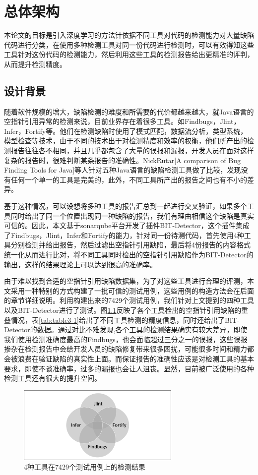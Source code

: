 \chapter{总体架构}
本论文的目标是引入深度学习的方法针依据不同工具对代码的检测能力对大量缺陷代码进行分类，在使用多种检测工具对同一份代码进行检测时，可以有效得知这些工具针对这份代码的检测能力，然后利用这些工具的检测报告给出更精准的评判，从而提升检测精度。
\section{设计背景}
随着软件规模的增大，缺陷检测的难度和所需要的代价都越来越大，就Java语言的空指针引用异常的检测来说，目前业界存在着很多工具。如Findbugs，Jlint，Infer，Fortify等。他们在检测缺陷时使用了模式匹配，数据流分析，类型系统，模型检查等技术，由于不同的技术出于对检测精度和效率的权衡，他们所产出的检测报告往往各不相同，并且几乎都包含了大量的误报和漏报，开发人员在面对这样复杂的报告时，很难判断某条报告的准确性。NickRutar[A comparison of Bug Finding Tools for Java]等人针对五种Java语言的缺陷检测工具做了比较，发现没有任何一个单一的工具是完美的，此外，不同工具所产出的报告之间也有不小的差异。

基于这种情况，可以设想将多种工具的报告汇总到一起进行交叉验证，如果多个工具同时给出了同一个位置出现同一种缺陷的报告，我们有理由相信这个缺陷是真实可信的。因此，本文基于sonarqube平台开发了插件BIT-Detector，这个插件集成了Findbugs，Jlint，Infer和Fortify的能力，针对同一份待测代码，首先使用4种工具分别检测并给出报告，然后过滤出空指针引用缺陷，最后将4份报告的内容格式统一化从而进行比对，将不同工具同时检出的空指针引用缺陷作为BIT-Detector的输出，这样的结果理论上可以达到很高的准确率。

由于难以找到合适的空指针引用缺陷数据集，为了对这些工具进行合理的评测，本文采用一种特别的方式构建了一批可信的测试用例，这些用例的构造方法会在后面的章节详细说明。利用构建出来的7429个测试用例，我们针对上文提到的四种工具以及BIT-Detector进行了测试。图\ref{fig:figure3-1}反映了各个工具检出的空指针引用缺陷的重叠情况，表\ref{tab:table3-1}给出了不同工具检测的精度信息，同时还给出了BIT-Detector的数据。通过对比不难发现,各个工具的检测结果确实有较大差异，即使我们使用检测准确度最高的Findbugs，也会面临超过三分之一的误报，这些误报掺杂在检测报告中会给开发人员的缺陷修复带来很多困扰，可能很多时间和精力都会被浪费在验证缺陷的真实性上面。而保证报告的准确性应该是对检测工具的基本要求，即使不谈准确率，过多的漏报也会让人沮丧。显然，目前被广泛使用的各种检测工具还有很大的提升空间。

\begin{figure}
	\centering
	\includegraphics[width=0.70\textwidth]{figures/vnfigure3-1}
	\caption{4种工具在7429个测试用例上的检测结果}\label{fig:figure3-1}
\end{figure}

